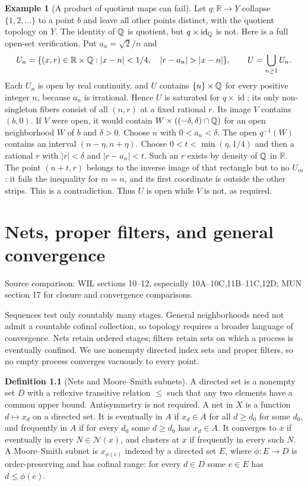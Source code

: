 \documentclass[11pt,oneside,openany]{book}
\theoremstyle{definition}
\newtheorem{definition}[theorem]{Definition}
\newtheorem{example}[theorem]{Example}
\theoremstyle{remark}
\newcommand{\R}{\mathbb R}\newcommand{\C}{\mathbb C}
\DeclareMathOperator{\id}{id}
\newcommand{\source}[1]{\par\begingroup\small\sffamily\color{black!65}Source comparison: #1\par\endgroup}
\begin{document}
\begin{example}[A product of quotient maps can fail]\label{d10:03:quotient-product-failure}
Let $q:\R\to Y$ collapse $\{1,2,\ldots\}$ to a point $b$ and leave all other points distinct, with the quotient topology on $Y$. The identity of $\mathbb Q$ is quotient, but $q\times\id_{\Q}$ is not. Here is a full open-set verification. Put $a_n=\sqrt2/n$ and
\[
 U_n=\{(x,r)\in\R\times\Q:|x-n|<1/4,\quad |r-a_n|>|x-n|\},\qquad U=\bigcup_{n\ge1}U_n.
\]
Each $U_n$ is open by real continuity, and $U$ contains $\{n\}\times\mathbb Q$ for every positive integer $n$, because $a_n$ is irrational. Hence $U$ is saturated for $q\times\id$; its only non-singleton fibers consist of all $(n,r)$ at a fixed rational $r$. Its image $V$ contains $(b,0)$. If $V$ were open, it would contain $W\times((-\delta,\delta)\cap\mathbb Q)$ for an open neighborhood $W$ of $b$ and $\delta>0$. Choose $n$ with $0<a_n<\delta$. The open $q^{-1}(W)$ contains an interval $(n-\eta,n+\eta)$. Choose $0<t<\min(\eta,1/4)$ and then a rational $r$ with $|r|<\delta$ and $|r-a_n|<t$. Such an $r$ exists by density of $\mathbb Q$ in $\R$. The point $(n+t,r)$ belongs to the inverse image of that rectangle but to no $U_m$: it fails the inequality for $m=n$, and its first coordinate is outside the other strips. This is a contradiction. Thus $U$ is open while $V$ is not, as required.
\end{example}



\chapter{Nets, proper filters, and general convergence}\label{ch:d10-04}
\source{WIL sections 10--12, especially 10A--10C,11B--11C,12D; MUN section 17 for closure and convergence comparisons.}

Sequences test only countably many stages. General neighborhoods need not admit a countable cofinal collection, so topology requires a broader language of convergence. Nets retain ordered stages; filters retain sets on which a process is eventually confined. We use nonempty directed index sets and proper filters, so no empty process converges vacuously to every point.

\begin{definition}[Nets and Moore--Smith subnets]\label{d10:04:nets}
A directed set is a nonempty set $D$ with a reflexive transitive relation $\le$ such that any two elements have a common upper bound. Antisymmetry is not required. A net in $X$ is a function $d\mapsto x_d$ on a directed set. It is eventually in $A$ if $x_d\in A$ for all $d\ge d_0$ for some $d_0$, and frequently in $A$ if for every $d_0$ some $d\ge d_0$ has $x_d\in A$. It converges to $x$ if eventually in every $N\in\mathcal N(x)$, and clusters at $x$ if frequently in every such $N$. A Moore--Smith subnet is $x_{\phi(e)}$ indexed by a directed set $E$, where $\phi:E\to D$ is order-preserving and has cofinal range: for every $d\in D$ some $e\in E$ has $d\le\phi(e)$.
\end{definition}
\end{document}
